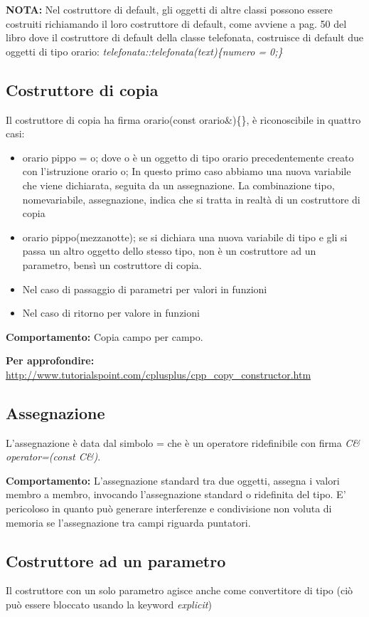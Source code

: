 \textbf{NOTA:} Nel costruttore di default, gli oggetti di altre classi possono essere costruiti richiamando il loro costruttore di default, come avviene a pag. 50 del libro dove il costruttore di default della classe telefonata, costruisce di default due oggetti di tipo orario:
\textit{telefonata::telefonata(text)\{numero = 0;\}}

\subsection{Costruttore di copia}
Il costruttore di copia ha firma orario(const orario\&)\{\}, è riconoscibile in quattro casi:
\begin{itemize}
	\item orario pippo = o; dove o è un oggetto di tipo orario precedentemente creato con l'istruzione orario o; In questo primo caso abbiamo una nuova variabile che viene dichiarata, seguita da un assegnazione. La combinazione tipo, nomevariabile, assegnazione, indica che si tratta in realtà di un costruttore di copia
	\item orario pippo(mezzanotte); se si dichiara una nuova variabile di tipo e gli si passa un altro oggetto dello stesso tipo, non è un costruttore ad un parametro, bensì un costruttore di copia.
	\item Nel caso di passaggio di parametri per valori in funzioni
	\item Nel caso di ritorno per valore in funzioni
\end{itemize} 

\textbf{Comportamento:} Copia campo per campo.

\textbf{Per approfondire:} \url{http://www.tutorialspoint.com/cplusplus/cpp_copy_constructor.htm}

\subsection{Assegnazione}
L'assegnazione è data dal simbolo = che è un operatore ridefinibile con firma \textit{C\& operator=(const C\&)}. 

\textbf{Comportamento:} L'assegnazione standard tra due oggetti, assegna i valori membro a membro, invocando l'assegnazione standard o ridefinita del tipo.
E' pericoloso in quanto può generare interferenze e condivisione non voluta di memoria se l'assegnazione tra campi riguarda puntatori.

\subsection{Costruttore ad un parametro}
Il costruttore con un solo parametro agisce anche come convertitore di tipo (ciò può essere bloccato usando la keyword \textit{explicit}) 

